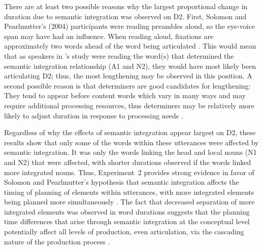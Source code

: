 \documentclass[12pt,titlepage]{article}
\newcommand{\IGNORE}[1]{} %
\begin{document}
There are at least two possible reasons why the largest proportional change in duration due to semantic integration was observed on D2.  First, Solomon and Pearlmutter's (2004) participants were reading preambles aloud, so the eye-voice span may have had an influence. When reading aloud, fixations are approximately two words ahead of the word being articulated \cite{InhoffEtAl11, EyeVoiceSpan}. This would mean that as speakers in \citeauthor{SolomonPearlmutter04}'s study were reading the word(s) that determined the semantic integration relationship (A1 and N2), they would have most likely been articulating D2; thus, the most lengthening may be observed in this position. A second possible reason is that determiners are good candidates for lengthening: They tend to appear before content words which vary in many ways and may require additional processing resources, thus determiners may be relatively more likely to adjust duration in response to processing needs \cite{BellEtAl09, FoxTreeClark97, JaegerKidd08}.

\IGNORE{
are easily accessible, appear before content words which vary in many ways and may require additional processing resources, and determiners tend to have both reduced and unreduced forms, it is likely that determiners may adjust duration easily in response to processing needs.


This has been suggested because determiners are high frequency, accessible, function words \cite{BellEtAl09, FoxTreeClark97, JaegerKidd08}. }

\IGNORE{
There was no evidence of prosodic breaks stronger than those expected after a word separating N1 and N2. It is not surprising that speakers were unlikely to produce evidence for breaks within these fairly short preambles. If they had, speakers would have had to produce breaks after a single prosodic word (i.e., the head noun and its determiner). If prosodic break placement is partially driven by recovery, as suggested by \citeA{WatsonEtAl06}, there would not be much to recover from at this point in the utterance, making these ideal preambles to examine the effects of semantic integration on word durations in the absence of prosodic breaks.}

Regardless of why the effects of semantic integration appear largest on D2, these results show that only some of the words within these utterances were affected by semantic integration. It was only the words linking the head and local nouns (N1 and N2) that were affected, with shorter durations observed if the words linked more integrated nouns. Thus, Experiment~2 provides strong evidence in favor of Solomon and Pearlmutter's \citeyear{SolomonPearlmutter04} hypothesis that semantic integration affects the timing of planning of elements within utterances, with more integrated elements being planned more simultaneously \cite<see also>{GillespiePearlmutter11, PearlmutterSolomonCUNY07}. The fact that decreased separation of more integrated elements was observed in word durations suggests that the planning time differences that arise through semantic integration at the conceptual level potentially affect all levels of production, even articulation, via the cascading nature of the production process \cite{BockLevelt94}.
\end{document}
